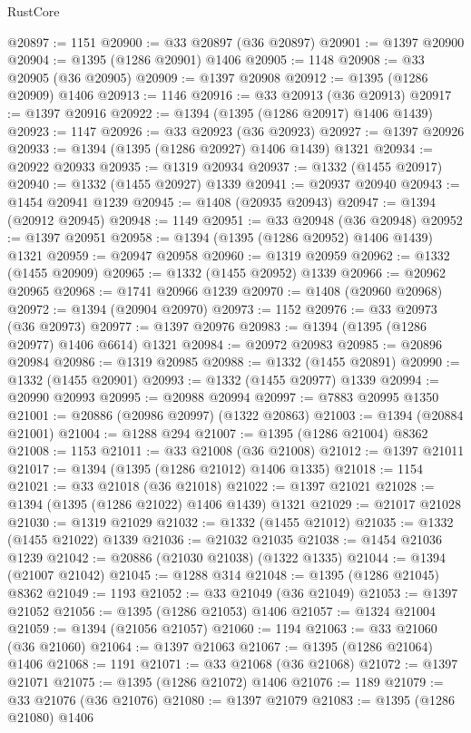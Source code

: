 \begin{lexlean}{RustCore}
\begin{coremodule}
@20897 := 1151
@20900 := @33 @20897 (@36 @20897)
@20901 := @1397 @20900
@20904 := @1395 (@1286 @20901) @1406
@20905 := 1148
@20908 := @33 @20905 (@36 @20905)
@20909 := @1397 @20908
@20912 := @1395 (@1286 @20909) @1406
@20913 := 1146
@20916 := @33 @20913 (@36 @20913)
@20917 := @1397 @20916
@20922 := @1394 (@1395 (@1286 @20917) @1406 @1439)
@20923 := 1147
@20926 := @33 @20923 (@36 @20923)
@20927 := @1397 @20926
@20933 := @1394 (@1395 (@1286 @20927) @1406 @1439) @1321
@20934 := @20922 @20933
@20935 := @1319 @20934
@20937 := @1332 (@1455 @20917)
@20940 := @1332 (@1455 @20927) @1339
@20941 := @20937 @20940
@20943 := @1454 @20941 @1239
@20945 := @1408 (@20935 @20943)
@20947 := @1394 (@20912 @20945)
@20948 := 1149
@20951 := @33 @20948 (@36 @20948)
@20952 := @1397 @20951
@20958 := @1394 (@1395 (@1286 @20952) @1406 @1439) @1321
@20959 := @20947 @20958
@20960 := @1319 @20959
@20962 := @1332 (@1455 @20909)
@20965 := @1332 (@1455 @20952) @1339
@20966 := @20962 @20965
@20968 := @1741 @20966 @1239
@20970 := @1408 (@20960 @20968)
@20972 := @1394 (@20904 @20970)
@20973 := 1152
@20976 := @33 @20973 (@36 @20973)
@20977 := @1397 @20976
@20983 := @1394 (@1395 (@1286 @20977) @1406 @6614) @1321
@20984 := @20972 @20983
@20985 := @20896 @20984
@20986 := @1319 @20985
@20988 := @1332 (@1455 @20891)
@20990 := @1332 (@1455 @20901)
@20993 := @1332 (@1455 @20977) @1339
@20994 := @20990 @20993
@20995 := @20988 @20994
@20997 := @7883 @20995 @1350
@21001 := @20886 (@20986 @20997) (@1322 @20863)
@21003 := @1394 (@20884 @21001)
@21004 := @1288 @294
@21007 := @1395 (@1286 @21004) @8362
@21008 := 1153
@21011 := @33 @21008 (@36 @21008)
@21012 := @1397 @21011
@21017 := @1394 (@1395 (@1286 @21012) @1406 @1335)
@21018 := 1154
@21021 := @33 @21018 (@36 @21018)
@21022 := @1397 @21021
@21028 := @1394 (@1395 (@1286 @21022) @1406 @1439) @1321
@21029 := @21017 @21028
@21030 := @1319 @21029
@21032 := @1332 (@1455 @21012)
@21035 := @1332 (@1455 @21022) @1339
@21036 := @21032 @21035
@21038 := @1454 @21036 @1239
@21042 := @20886 (@21030 @21038) (@1322 @1335)
@21044 := @1394 (@21007 @21042)
@21045 := @1288 @314
@21048 := @1395 (@1286 @21045) @8362
@21049 := 1193
@21052 := @33 @21049 (@36 @21049)
@21053 := @1397 @21052
@21056 := @1395 (@1286 @21053) @1406
@21057 := @1324 @21004
@21059 := @1394 (@21056 @21057)
@21060 := 1194
@21063 := @33 @21060 (@36 @21060)
@21064 := @1397 @21063
@21067 := @1395 (@1286 @21064) @1406
@21068 := 1191
@21071 := @33 @21068 (@36 @21068)
@21072 := @1397 @21071
@21075 := @1395 (@1286 @21072) @1406
@21076 := 1189
@21079 := @33 @21076 (@36 @21076)
@21080 := @1397 @21079
@21083 := @1395 (@1286 @21080) @1406

\end{coremodule}
\end{lexlean}
